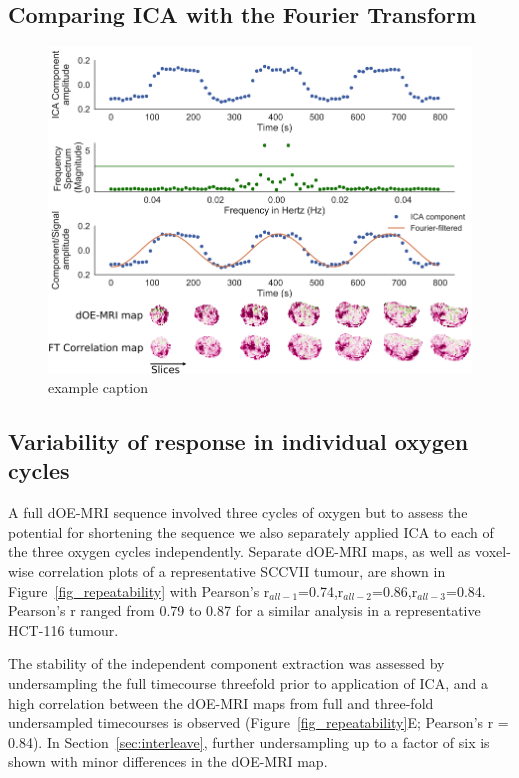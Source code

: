 \subsection{Comparing ICA with the Fourier Transform}


\begin{figure}[htbp]
   \centering
   \includegraphics[width=\textwidth]{oemri_thesis1/oemri_thesis1-images/final_FT.png} %
   \caption{example caption}
   \label{fig_FT}
\end{figure}


\subsection{Variability of response in individual oxygen cycles}
\label{res3}

A full \acs{dOE-MRI} sequence involved three cycles of oxygen but to assess the potential for shortening the sequence we also separately applied \acs{ICA} to each of the three oxygen cycles independently.
Separate \acs{dOE-MRI} maps, as well as voxel-wise correlation plots of a representative SCCVII tumour, are shown in Figure~\ref{fig_repeatability} with Pearson's r$_{all-1}$=0.74,r$_{all-2}$=0.86,r$_{all-3}$=0.84.
Pearson's r ranged from 0.79 to 0.87 for a similar analysis in a representative HCT-116 tumour.

The stability of the independent component extraction was assessed by undersampling the full timecourse threefold prior to application of \acs{ICA}, and a high correlation between the \acs{dOE-MRI} maps from full and three-fold undersampled timecourses is observed (Figure~\ref{fig_repeatability}E; Pearson's r = 0.84). 
In Section~\ref{sec:interleave}, further undersampling up to a factor of six is shown with minor differences in the \acs{dOE-MRI} map.


